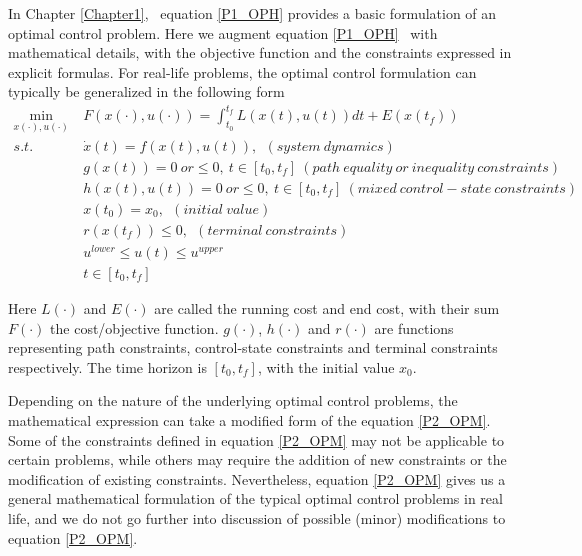 \documentclass  [
  paper    = a4,
  BCOR     = 10mm,
  twoside,
  fontsize = 12pt,
  fleqn,
  toc      = bibnumbered,
  toc      = listofnumbered,
  numbers  = noendperiod,
  headings = normal,
  listof   = leveldown,
  version  = 3.03
]                                       {scrreprt}
\newcommand{\<}{\langle}
\renewcommand{\>}{\rangle}
\begin{document}
In Chapter \ref{Chapter1},  equation \ref{P1_OPH} provides a basic formulation of an optimal control problem. Here we augment equation \ref{P1_OPH}  with mathematical details, with the objective function and the constraints expressed in explicit formulas. For real-life problems, the optimal control formulation can typically be generalized in the following form  
	\begin{subequations}
		\begin{align}
			\underset{x(\cdot), u(\cdot)}{\text{min}}   \ &  F(x(\cdot), u(\cdot))  = \int_{t_0}^{t_f}L(x(t), u(t))dt + E (x(t_f)) \label{P2_cost} \\
			s.t.\ \ &  \dot{x} (t) = f(x(t), u(t)), \ \ (system \ dynamics)   \label{P2_sd} \\
			& g(x(t)) = 0 \  or \leq 0, \ t \in [t_0, t_f]\  (path\  equality\ or\ inequality\ constraints)  \label{P2_ec}\\
			& h(x(t), u(t)) =0\  or  \leq 0,\ t \in [t_0, t_f] \ (mixed \ control-state  \ constraints)  \label{P2_inc}\\
			& x(t_0) = x_0, \ \ (initial \ value) \\
			& r(x(t_f)) \leq 0, \ \ (terminal \ constraints)  \label{P2_final} \\
			& u^{lower} \leq u(t) \leq u^{upper}   \label{P2_box_u} \\ 
			& t \in [t_0, t_f]
		\end{align}
		\label{P2_OPM}
	\end{subequations}  

Here $L(\cdot)$ and $E(\cdot)$ are called the running cost and end cost, with their sum $F(\cdot)$ the cost/objective function. $g(\cdot)$, $h(\cdot)$ and $r(\cdot)$ are functions representing path constraints, control-state constraints and terminal constraints respectively. The time horizon is $[t_0, t_f]$, with the initial value $x_0$.   

Depending on the nature of the underlying optimal control problems, the mathematical expression can take a modified form of the equation \ref{P2_OPM}. Some of the constraints defined in equation \ref{P2_OPM} may not be applicable to certain problems, while others may require the addition of new constraints or the modification of existing constraints. Nevertheless, equation \ref{P2_OPM} gives us a general mathematical formulation of the typical optimal control problems in real life, and we do not go further into discussion of possible (minor) modifications to equation \ref{P2_OPM}. 
\end{document}
